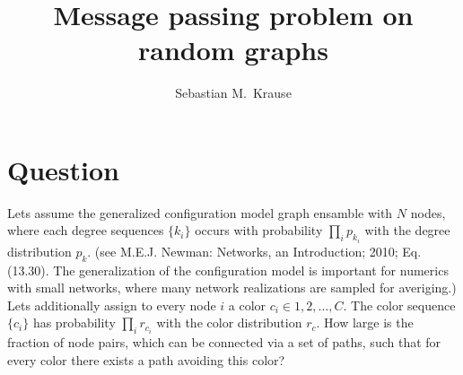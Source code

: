 \documentclass[aps, pre, onecolumn, a4paper, floatfix]{revtex4}
\begin{document}
\title{Message passing problem on random graphs}
\author{Sebastian M.\ Krause}
\affiliation{}
\begin{abstract}

\end{abstract}
\maketitle

\section{Question}

Lets assume the generalized configuration model graph ensamble with $N$ nodes, 
where each degree sequences $\{k_i\}$ occurs with probability $\prod_i p_{k_i}$ 
with the degree distribution $p_{k}$. 
(see M.E.J. Newman: Networks, an Introduction; 2010; Eq. (13.30). The generalization 
of the configuration model is important for numerics with small networks, where 
many network realizations are sampled for averiging.) Lets additionally assign to 
every node $i$ a color $c_i\in 1,2,\dots,C$. The color sequence $\{c_i\}$ has 
probability $\prod_i r_{c_i}$ with the color distribution $r_c$. 
How large is the fraction of node pairs, which can be connected via a set of  
paths, such that for every color there exists a path avoiding this color? 
\end{document}
